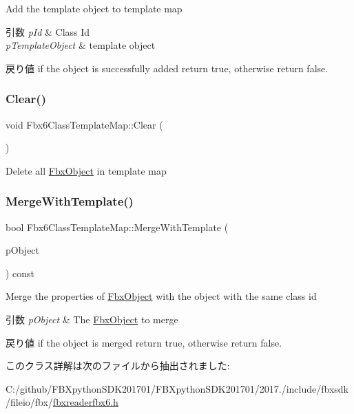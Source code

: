 Add the template object to template map 
\begin{DoxyParams}{引数}
{\em p\+Id} & Class Id \\
\hline
{\em p\+Template\+Object} & template object \\
\hline
\end{DoxyParams}
\begin{DoxyReturn}{戻り値}
if the object is successfully added return {\ttfamily true}, otherwise return {\ttfamily false}. 
\end{DoxyReturn}
\mbox{\label{class_fbx6_class_template_map_a522d86033875290b78d0034909997fde}} 
\subsubsection{\texorpdfstring{Clear()}{Clear()}}
{\footnotesize\ttfamily void Fbx6\+Class\+Template\+Map\+::\+Clear (\begin{DoxyParamCaption}{ }\end{DoxyParamCaption})}

Delete all \hyperlink{class_fbx_object}{Fbx\+Object} in template map \mbox{\label{class_fbx6_class_template_map_a93b436ce1ce8f65302b675cb3a085134}} 
\subsubsection{\texorpdfstring{Merge\+With\+Template()}{MergeWithTemplate()}}
{\footnotesize\ttfamily bool Fbx6\+Class\+Template\+Map\+::\+Merge\+With\+Template (\begin{DoxyParamCaption}\item[{\hyperlink{class_fbx_object}{Fbx\+Object} $\ast$}]{p\+Object }\end{DoxyParamCaption}) const}

Merge the properties of \hyperlink{class_fbx_object}{Fbx\+Object} with the object with the same class id 
\begin{DoxyParams}{引数}
{\em p\+Object} & The \hyperlink{class_fbx_object}{Fbx\+Object} to merge \\
\hline
\end{DoxyParams}
\begin{DoxyReturn}{戻り値}
if the object is merged return {\ttfamily true}, otherwise return {\ttfamily false}. 
\end{DoxyReturn}


このクラス詳解は次のファイルから抽出されました\+:\begin{DoxyCompactItemize}
\item 
C\+:/github/\+F\+B\+Xpython\+S\+D\+K201701/\+F\+B\+Xpython\+S\+D\+K201701/2017./include/fbxsdk/fileio/fbx/\hyperlink{fbxreaderfbx6_8h}{fbxreaderfbx6.\+h}\end{DoxyCompactItemize}
